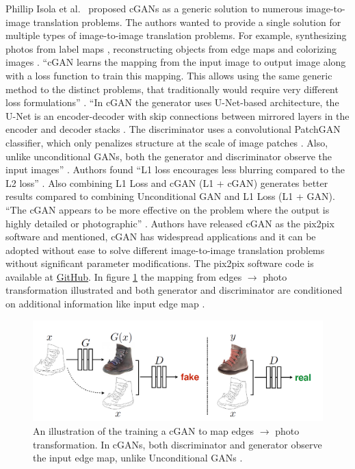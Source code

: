 Phillip Isola et al.\ \cite{isola2018imagetoimage} proposed \acp{cGAN} as a generic solution to numerous image-to-image translation problems. The authors wanted to provide a single solution for multiple types of image-to-image translation problems. For example, synthesizing photos from label maps \cite{cordts2016cityscapes}, reconstructing objects from edge maps \cite{zhu2018generative} \cite{6909426} and colorizing images \cite{wesley2021colorizing}. ``\ac{cGAN} learns the mapping from the input image to output image along with a loss function to train this mapping. This allows using the same generic method to the distinct problems, that traditionally would require very different loss formulations'' \cite{isola2018imagetoimage}. ``In \ac{cGAN} the generator uses U-Net-based architecture, the U-Net is an encoder-decoder with skip connections between mirrored layers in the encoder and decoder stacks \cite{ronneberger2015unet}. The discriminator uses a convolutional PatchGAN classifier, which only penalizes structure at the scale of image patches \cite{li2016precomputed}. Also, unlike unconditional \acp{GAN}, both the generator and discriminator observe the input images'' \cite{isola2018imagetoimage}. Authors found ``L1 loss encourages less blurring compared to the L2 loss'' \cite{isola2018imagetoimage}. Also combining L1 Loss and \ac{cGAN} (L1 + \ac{cGAN}) generates better results compared to combining Unconditional \ac{GAN} and L1 Loss (L1 + \ac{GAN}). ``The \ac{cGAN} appears to be more effective on the problem where the output is highly detailed or photographic'' \cite{isola2018imagetoimage}. Authors have released \ac{cGAN} as the pix2pix software and mentioned, \ac{cGAN} has widespread applications and it can be adopted without ease to solve different image-to-image translation problems without significant parameter modifications. The pix2pix software code is available at \href{https://github.com/phillipi/pix2pix.}{GitHub}. In figure \ref{fig:CGAN} the mapping from edges $\rightarrow$ photo transformation illustrated and both generator and discriminator are conditioned on additional information like input edge map \cite{isola2018imagetoimage}.


\begin{figure}[H]
        \begin{center}
 	    \includegraphics[scale=0.30]{images/relatedWorks/CGAN.png}
	    \caption[An illustration of training a \ac{cGAN} to map edges $\rightarrow$	 photo transformation.]{An illustration of the training a \ac{cGAN} to map edges $\rightarrow$ photo transformation. In \acp{cGAN}, both discriminator and generator observe the input edge map, unlike Unconditional \acp{GAN} \cite{isola2018imagetoimage}.}
	    \label{fig:CGAN}
	    \end{center}
\end{figure}

